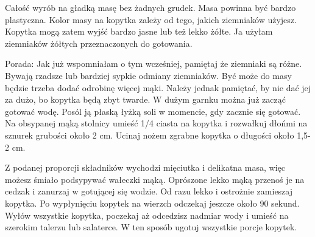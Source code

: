 \documentclass[12pt, letterpaper, titlepage]{article}
\begin{document}
Całość wyrób na gładką masę bez żadnych grudek. Masa powinna być bardzo plastyczna. Kolor masy na kopytka zależy od tego, jakich ziemniaków użyjesz. Kopytka mogą zatem wyjść bardzo jasne lub też lekko żółte. Ja użyłam ziemniaków żółtych przeznaczonych do gotowania. 

Porada: Jak już wspomniałam o tym wcześniej, pamiętaj że ziemniaki są różne. Bywają rzadsze lub bardziej sypkie odmiany ziemniaków. Być może do masy będzie trzeba dodać odrobinę więcej mąki. Należy jednak pamiętać, by nie dać jej za dużo, bo kopytka będą zbyt twarde.
W dużym garnku można już zacząć gotować wodę. Posól ją płaską łyżką soli w momencie, gdy zacznie się gotować. Na obsypanej mąką stolnicy umieść 1/4 ciasta na kopytka i rozwałkuj dłońmi na sznurek grubości około 2 cm. Ucinaj nożem zgrabne kopytka o długości około 1,5-2 cm. 

Z podanej proporcji składników wychodzi mięciutka i delikatna masa, więc możesz śmiało podsypywać wałeczki mąką. 
Oprószone lekko mąką przenoś je na cedzak i zanurzaj w gotującej się wodzie. Od razu lekko i ostrożnie zamieszaj kopytka. Po wypłynięciu kopytek na wierzch odczekaj jeszcze około 90 sekund. Wyłów wszystkie kopytka, poczekaj aż odcedzisz nadmiar wody i umieść na szerokim talerzu lub salaterce. W ten sposób ugotuj wszystkie porcje kopytek.
\end{document}
